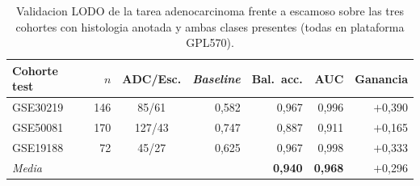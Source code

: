 \begin{table}[htbp]
\centering
\caption[Control positivo: subtipo histologico]{Validacion LODO de la tarea
adenocarcinoma frente a escamoso sobre las tres cohortes con histologia anotada
y ambas clases presentes (todas en plataforma GPL570).}
\label{tab:subtipo}
\small
\begin{tabular}{lrcrrrr}
\toprule
Cohorte test & $n$ & ADC/Esc. & \emph{Baseline} & Bal.\ acc. & AUC & Ganancia \\
\midrule
GSE30219 & 146 & 85/61 & 0,582 & 0,967 & 0,996 & $+$0,390 \\
GSE50081 & 170 & 127/43 & 0,747 & 0,887 & 0,911 & $+$0,165 \\
GSE19188 & 72 & 45/27 & 0,625 & 0,967 & 0,998 & $+$0,333 \\
\midrule
\multicolumn{4}{l}{\emph{Media}} &
\textbf{0,940} &
\textbf{0,968} &
$+$0,296 \\
\bottomrule
\end{tabular}
\end{table}
